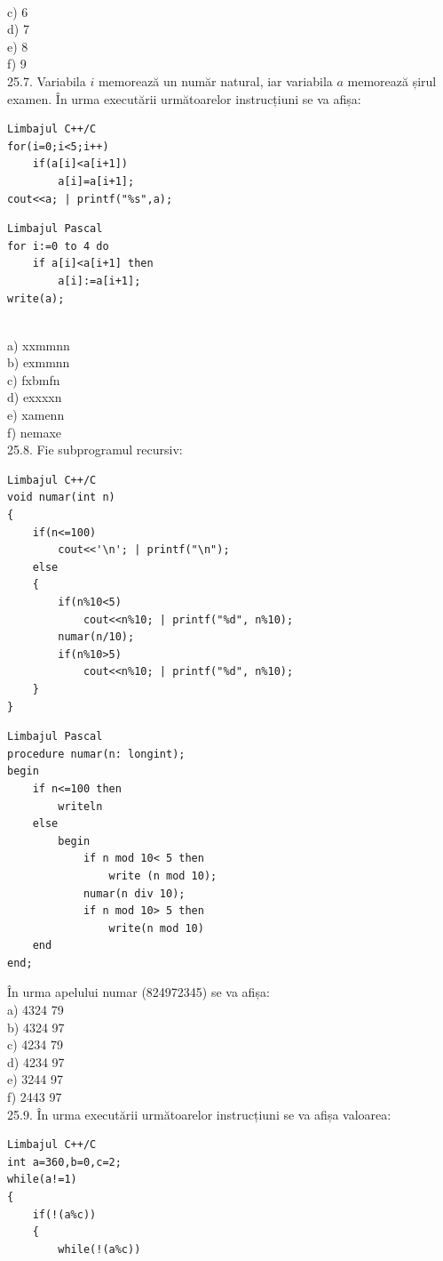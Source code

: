 {{\\
c) 6
\\
d) 7
\\
e) 8
\\
f) 9
\\
25.7. Variabila $i$ memorează un număr natural, iar variabila $a$ memorează șirul examen. În urma executării următoarelor instrucțiuni se va afișa:
\begin{verbatim}
Limbajul C++/C
for(i=0;i<5;i++)
    if(a[i]<a[i+1])
        a[i]=a[i+1];
cout<<a; | printf("%s",a);
\end{verbatim}
\begin{verbatim}
Limbajul Pascal
for i:=0 to 4 do
    if a[i]<a[i+1] then
        a[i]:=a[i+1];
write(a);
\end{verbatim}
\\
a) xxmmnn
\\
b) exmmnn
\\
c) fxbmfn
\\
d) exxxxn
\\
e) xamenn
\\
f) nemaxe
\\
25.8. Fie subprogramul recursiv:
\begin{verbatim}
Limbajul C++/C
void numar(int n)
{
    if(n<=100)
        cout<<'\n'; | printf("\n");
    else
    {
        if(n%10<5)
            cout<<n%10; | printf("%d", n%10);
        numar(n/10);
        if(n%10>5)
            cout<<n%10; | printf("%d", n%10);
    }
}
\end{verbatim}
\begin{verbatim}
Limbajul Pascal
procedure numar(n: longint);
begin
    if n<=100 then
        writeln
    else
        begin
            if n mod 10< 5 then
                write (n mod 10);
            numar(n div 10);
            if n mod 10> 5 then
                write(n mod 10)
    end
end;
\end{verbatim}
În urma apelului numar (824972345) se va afișa:
\\
a) 4324
   79
\\
b) 4324
   97
\\
c) 4234
   79
\\
d) 4234
   97
\\
e) 3244
   97
\\
f) 2443
   97
\\
25.9. În urma executării următoarelor instrucțiuni se va afișa valoarea:
\begin{verbatim}
Limbajul C++/C
int a=360,b=0,c=2;
while(a!=1)
{
    if(!(a%c))
    {
        while(!(a%c))

\end{verbatim}}}
